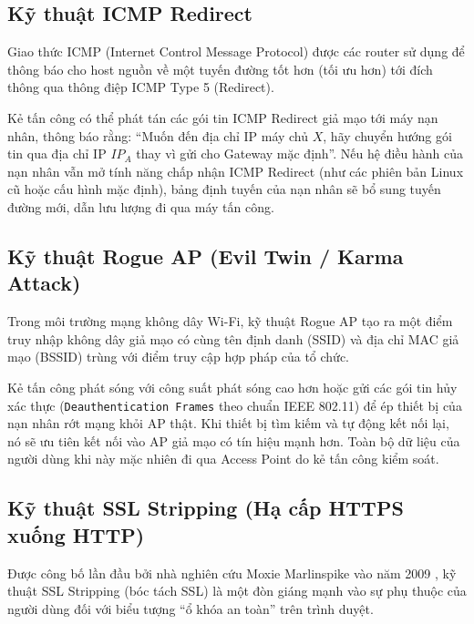 \subsection{Kỹ thuật ICMP Redirect}

Giao thức ICMP (Internet Control Message Protocol) được các router sử dụng để thông báo cho host nguồn về một tuyến đường tốt hơn (tối ưu hơn) tới đích thông qua thông điệp ICMP Type 5 (Redirect).

Kẻ tấn công có thể phát tán các gói tin ICMP Redirect giả mạo tới máy nạn nhân, thông báo rằng: ``Muốn đến địa chỉ IP máy chủ $X$, hãy chuyển hướng gói tin qua địa chỉ IP $IP_A$ thay vì gửi cho Gateway mặc định''. Nếu hệ điều hành của nạn nhân vẫn mở tính năng chấp nhận ICMP Redirect (như các phiên bản Linux cũ hoặc cấu hình mặc định), bảng định tuyến của nạn nhân sẽ bổ sung tuyến đường mới, dẫn lưu lượng đi qua máy tấn công.

\subsection{Kỹ thuật Rogue AP (Evil Twin / Karma Attack)}

Trong môi trường mạng không dây Wi-Fi, kỹ thuật Rogue AP tạo ra một điểm truy nhập không dây giả mạo có cùng tên định danh (SSID) và địa chỉ MAC giả mạo (BSSID) trùng với điểm truy cập hợp pháp của tổ chức.

Kẻ tấn công phát sóng với công suất phát sóng cao hơn hoặc gửi các gói tin hủy xác thực (\texttt{Deauthentication Frames} theo chuẩn IEEE 802.11) để ép thiết bị của nạn nhân rớt mạng khỏi AP thật. Khi thiết bị tìm kiếm và tự động kết nối lại, nó sẽ ưu tiên kết nối vào AP giả mạo có tín hiệu mạnh hơn. Toàn bộ dữ liệu của người dùng khi này mặc nhiên đi qua Access Point do kẻ tấn công kiểm soát.

\subsection{Kỹ thuật SSL Stripping (Hạ cấp HTTPS xuống HTTP)}

Được công bố lần đầu bởi nhà nghiên cứu Moxie Marlinspike vào năm 2009 \cite{marlinspike2009sslstrip}, kỹ thuật SSL Stripping (bóc tách SSL) là một đòn giáng mạnh vào sự phụ thuộc của người dùng đối với biểu tượng ``ổ khóa an toàn'' trên trình duyệt.

